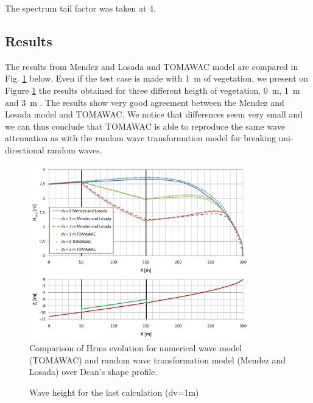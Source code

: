 The spectrum tail factor was taken at 4.

\subsection{Results}
%
 The results from Mendez and Losada and TOMAWAC model are compared in Fig. \ref{figresvito} below.
Even if the test case is made with 1~m of vegetation, we present on Figure \ref{figresvito} the results obtained for three different heigth of vegetation, 0~m, 1~m and 3~m \cite{Bacchi2014}.
The results show very good agreement between the Mendez  and Losada model \cite{Mendez2004} and TOMAWAC. We notice that differences seem very small and we can thus conclude that TOMAWAC is able to reproduce the same wave attenuation as with the random wave transformation model for breaking uni-directional random waves.
\begin{figure} [!h]
\centering
\includegraphics[width=0.85\textwidth]{resdean.png}
 \caption{Comparison of Hrms evolution for numerical wave model (TOMAWAC) and random wave transformation model (Mendez and Losada) over Dean’s shape profile.}
\label{figresvito}
\end{figure}

\begin{figure} [!h]
\centering
{}
 \caption{Wave height for the last calculation (dv=1m)}
\label{figrescalc}
\end{figure}



